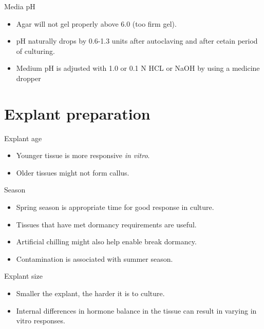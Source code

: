 \documentclass[ignorenonframetext,aspectratio=169]{beamer}
\providecommand{\tightlist}{%
  \setlength{\itemsep}{0pt}\setlength{\parskip}{0pt}}
\begin{document}
\begin{frame}{Media pH}
\protect\hypertarget{media-ph}{}

\begin{itemize}
\tightlist
\item
  Agar will not gel properly above 6.0 (too firm gel).
\item
  pH naturally drops by 0.6-1.3 units after autoclaving and after cetain
  period of culturing.
\item
  Medium pH is adjusted with 1.0 or 0.1 N HCL or NaOH by using a
  medicine dropper
\end{itemize}

\end{frame}

\hypertarget{explant-preparation}{%
\section{Explant preparation}\label{explant-preparation}}

\begin{frame}{Explant age}
\protect\hypertarget{explant-age}{}

\begin{itemize}
\tightlist
\item
  Younger tissue is more responsive \emph{in vitro}.
\item
  Older tissues might not form callus.
\end{itemize}

\end{frame}

\begin{frame}{Season}
\protect\hypertarget{season}{}

\begin{itemize}
\tightlist
\item
  Spring season is appropriate time for good response in culture.
\item
  Tissues that have met dormancy requirements are useful.
\item
  Artificial chilling might also help enable break dormancy.
\item
  Contamination is associated with summer season.
\end{itemize}

\end{frame}

\begin{frame}{Explant size}
\protect\hypertarget{explant-size}{}

\begin{itemize}
\tightlist
\item
  Smaller the explant, the harder it is to culture.
\item
  Internal differences in hormone balance in the tissue can result in
  varying in vitro responses.
\end{itemize}

\end{frame}
\end{document}
